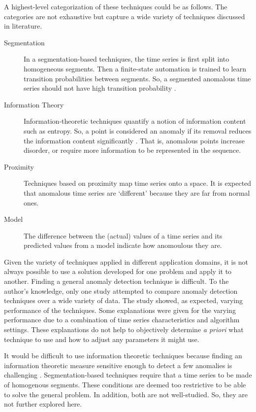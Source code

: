 A highest-level categorization of these techniques could be as follows. The categories are not exhaustive but capture a wide variety of techniques discussed in literature.

\begin{description}

\item[Segmentation] In a segmentation-based techniques, the time series is first split into homogeneous segments. Then a finite-state automation is trained to learn transition probabilities between segments. So, a segmented anomalous time series should not have high transition probability \cite{Salvador2005,mahoney2005trajectory,Chan2005}.

\item[Information Theory] Information-theoretic techniques quantify a notion of information content such as entropy. So, a point is considered an anomaly if its removal reduces the information content significantly \cite{Muthukrishnan2004,jagadish1999mining}. That is, anomalous points increase disorder, or require more information to be represented in the sequence.

\item[Proximity] Techniques based on proximity map time series onto a space. It is expected that anomalous time series are `different' because they are far from normal ones.

\item[Model] The difference between the (actual) values of a time series and its predicted values from a model indicate how anomoulous they are.
 
\end{description}


Given the variety of techniques applied in different application domains, it is not always possible to use a solution developed for one problem and apply it to another. Finding a general anomaly detection technique is difficult. To the author's knowledge, only one study \cite{Cheboli2010} attempted to compare anomaly detection techniques over a wide variety of data. The study showed, as expected, varying performance of the techniques. Some explanations were given for the varying performance due to a combination of time series characteristics and algorithm settings. These explanations do not help to objectively determine \emph{a priori} what technique to use and how to adjust any parameters it might use.

It would be difficult to use information theoretic techniques because finding an information theoretic measure sensitive enough to detect a few anomalies is challenging \cite{Chandola2009}. Segmentation-based techniques require that a time series to be made of homogenous segments. These conditions are deemed too restrictive to be able to solve the general problem. In addition, both are not well-studied. So, they are not further explored here.

